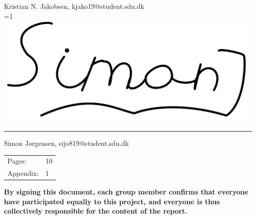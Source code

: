 Kristian N. Jakobsen, kjako19@student.sdu.dk\\


\ifnum\value{PROD}=1
    \includegraphics[scale=0.042]{images/signatures/signatureSJ.png}
    \vspace{-3.5mm}
\fi
\par\rule{\textwidth}{0.4pt}

Simon Jørgensen, sijo819@student.sdu.dk\\


\begin{tabular}{@{}l l}
Pages:      & 10 \\
Appendix:   & 1
\end{tabular}

\vspace{3.5mm}

\begin{footnotesize}

\textbf{By signing this document, each group member confirms that everyone have participated equally to this project, and everyone is thus collectively responsible for the content of the report.}
\end{footnotesize}
